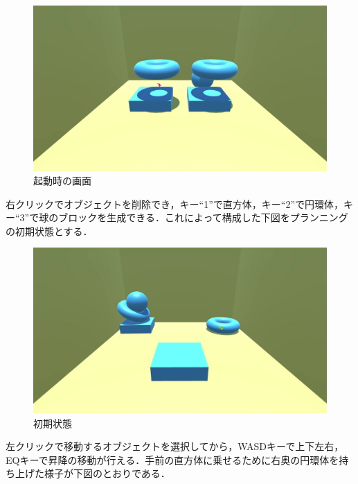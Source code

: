 \documentclass[12pt]{jarticle}
\begin{document}
\begin{figure}[!hbt]
  	\begin{center}
  		\includegraphics[scale=0.2]{images/bwp3.jpg}
	\end{center}
  	\caption{起動時の画面}
\end{figure}
\clearpage

右クリックでオブジェクトを削除でき，キー``1''で直方体，キー``2''で円環体，キー``3''で球のブロックを生成できる．これによって構成した下図をプランニングの初期状態とする．

\begin{figure}[!hbt]
  	\begin{center}
  		\includegraphics[scale=0.2]{images/bwp4.jpg}
	\end{center}
  	\caption{初期状態}
\end{figure}
\clearpage

左クリックで移動するオブジェクトを選択してから，WASDキーで上下左右，EQキーで昇降の移動が行える．手前の直方体に乗せるために右奥の円環体を持ち上げた様子が下図のとおりである．
\end{document}
